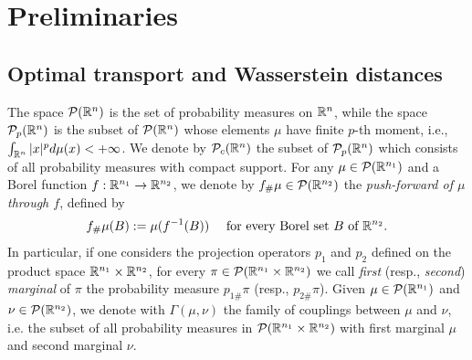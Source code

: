 
\section{Preliminaries}\label{meanfield}
\subsection{Optimal transport and Wasserstein distances}

The space $\mathcal{P}(\mathbb{R}^n)$ is the set of probability measures on $\mathbb{R}^n$, while the space %
$\mathcal{P}_p(\mathbb{R}^n)$ is the subset of $\mathcal{P}(\mathbb{R}^n)$ whose elements $\mu$ have finite $p$-th moment, i.e.,
$\int_{\mathbb{R}^n} |x|^p d\mu(x) < +\infty$.
We denote by $\mathcal{P}_c(\mathbb{R}^n)$ the subset of $\mathcal{P}_p(\mathbb{R}^n)$ which consists of all probability measures with compact support. %
For any $\mu \in \mathcal{P}(\mathbb{R}^{n_1})$ and  a Borel function $f: \mathbb{R}^{n_1} \to \mathbb{R}^{n_2}$, we denote by $f_{\#}\mu \in \mathcal{P}(\mathbb{R}^{n_2})$ the {\it push-forward of $\mu$ through $f$}, defined by
\begin{align*}
f_{\#}\mu(B) := \mu(f^{-1}(B)) \quad \text{ for every Borel set } B \text{ of } \mathbb{R}^{n_2}.
\end{align*}
In particular, if one considers the projection operators $p_1$ and $p_2$ defined on the product space $\mathbb{R}^{n_1} \times \mathbb{R}^{n_2}$, for every $\pi \in \mathcal{P}(\mathbb{R}^{n_1} \times \mathbb{R}^{n_2})$ we call {\it first} (resp., {\it second}) {\it marginal} of $\pi$ the probability measure $p_{1\#}\pi$ (resp., $p_{2\#}\pi$). Given $\mu \in \mathcal{P}(\mathbb{R}^{n_1})$ and $\nu \in \mathcal{P}(\mathbb{R}^{n_2})$, we denote with $\Gamma(\mu, \nu)$ the family of couplings between $\mu$ and $\nu$, i.e. the subset of all probability measures in $\mathcal{P}(\mathbb{R}^{n_1} \times \mathbb{R}^{n_2})$ with first marginal $\mu$ and second marginal $\nu$.

